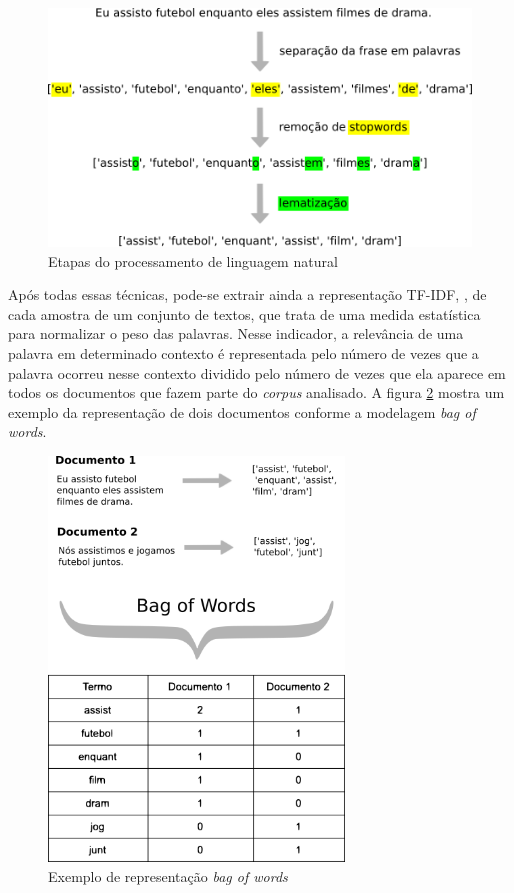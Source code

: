\begin{figure}[!ht]
	\centering
	\includegraphics[width=1\textwidth]{figures/nltp_example.png}
	\caption{Etapas do processamento de linguagem natural}
	\label{fig:nl_ex}
\end{figure}

Após todas essas técnicas, pode-se extrair ainda a representação TF-IDF, \cite{InformationRetrievalBookChapter6}, de cada amostra de um conjunto de textos, que trata de uma medida estatística para normalizar o peso das palavras. Nesse indicador, a relevância de uma palavra em determinado contexto é representada pelo número de vezes que a palavra ocorreu nesse contexto dividido pelo número de vezes que ela aparece em todos os documentos que fazem parte do \textit{corpus} analisado. A figura \ref{fig:bow_ex} mostra um exemplo da representação de dois documentos conforme a modelagem \textit{bag of words}.


\begin{figure}[!ht]
	\centering
	\includegraphics[width=0.7\textwidth]{figures/bag_of_words_example.png}
	\caption{Exemplo de representação \textit{bag of words}}
	\label{fig:bow_ex}
\end{figure}

